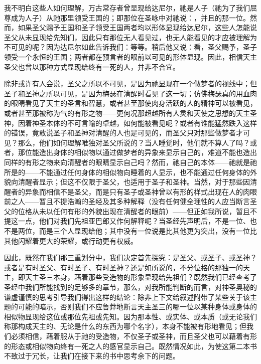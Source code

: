 我不明白这些人如何理解，万古常存者曾显现给达尼尔，祂是人子（祂为了我们屈尊成为人子）从祂那里领受王国的；即那位在圣咏中对祂说：，并且的那一位。然而，如果圣父赐予王国和圣子领受王国两者均以形体显现给达尼尔，这些人怎能说圣父从未显现给先知们，因此只有那位无人看见过，也无人能看见的才应被理解为不可见的呢？因为达尼尔如此告诉我们：等等。稍后他又说：看，圣父赐予，圣子领受一个永恒的王国；两者都在预言者的眼前以可见的形体显现。因此，相信天主圣父也曾以那种方式显现给终有一死的人，并非不合宜。\par

除非或许有人会说，圣父之所以不可见，是因为祂显现在一个做梦者的视线中；但圣子和圣神之所以可见，是因为梅瑟在清醒时看见了这一切；仿佛梅瑟真的用血肉的眼睛看见了天主的圣言和智慧，或者甚至那使肉身活跃的人的精神可以被看见，或者甚至那被称为气的有形之物——更何况那超越所有人灵和天使之思想的天主圣神，因着神圣本体的不可言喻的卓越，如何能被看见呢？或者有谁能猛然跌入这样的错误，竟敢说圣子和圣神对清醒的人也是可见的，而圣父只对那些做梦者才可见？那么，他们如何理解唯独对圣父所说的？当人睡觉时，他们就不算人了吗？或者，那位能造出身体的相似物以通过做梦者的异象来显示自己的，难道不能也造出同样的有形之物来向清醒者的眼睛显示自己吗？然而，祂自己的本体——祂就是祂所是的——不能通过任何身体的相似物向睡着的人显示，也不能通过任何身体的外貌向清醒者显示；但这不仅限于圣父，也适用于圣子和圣神。当然，对于那些因清醒者的异象而相信不是圣父，而是只有圣子或圣神曾以有形的样式出现在人的肉眼前之人——暂且不提浩瀚的圣经及其多种解释（没有任何健全理性的人应当断言圣父的位格从未以任何有形的外貌出现在清醒者的眼前）——但正如我所说，暂且不提这一点，他们对我们先祖亚巴郎又作何解释呢？当圣经先声明后，不是一位、也不是两位，而是三个人显现给他；其中没有一位说是比其他更为突出，没有一位比其他闪耀着更大的荣耀，或行动更有权威。\par

因此，既然在我们那三重划分中，我们决定首先探究：是圣父、或圣子、或圣神？或者是有时圣父、有时圣子、有时圣神？还是如所说的，不分位格的那独一的天主，即天主圣三本身，藉着那些受造物的形象显现给先祖们？既然我们已经查考了圣经中我们所能找到的足够多的章节，那么，对我所能判断的而言，对神圣奥秘的谦虚谨慎的思考引导我们得出这样的结论：除非上下文给叙述附带了某些关于该主题的可能的暗示，否则我们不应鲁莽地断言天主圣三的哪一位以某种身体或身体的相似物显现给这位或那位先祖或先知。因为那本性、或实体、或本质（或无论我们称那构成天主的、无论是什么的东西为哪个名字），本身不能被有形地看见；但我们必须相信，藉着服从于祂的受造物，不仅圣子或圣神，而且圣父也可以藉着有形的形态或相似物向终有一死之人的感官显示自己。既然情况如此，为使这第二本书不致过于冗长，让我们在接下来的书中思考余下的问题。\par

